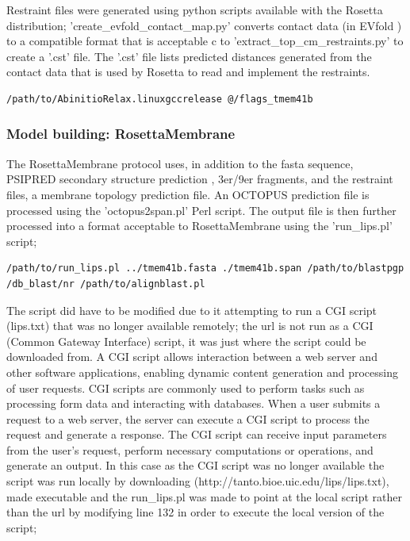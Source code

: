 Restraint files were generated using python scripts available with the Rosetta distribution; 'create\_evfold\_contact\_map.py' converts contact data (in EVfold \cite{braun2015combining}) to a compatible format that is acceptable c to 'extract\_top\_cm\_restraints.py' \cite{braun2015combining} to create a '.cst' file.  The '.cst' file lists predicted distances generated from the contact data that is used by Rosetta to read and implement the restraints.

\begin{lstlisting}[style=linux-terminal]
/path/to/AbinitioRelax.linuxgccrelease @/flags_tmem41b
\end{lstlisting}


\subsubsection{Model building: RosettaMembrane}
The RosettaMembrane protocol \cite{yarov2006multipass} uses, in addition to the fasta sequence, PSIPRED secondary structure prediction \cite{McGuffin2000}, 3er/9er fragments, and the restraint files, a membrane topology prediction file.  An OCTOPUS \cite{Viklund2008} prediction file is processed using the 'octopus2span.pl' Perl script.  The output file is then further processed into a format acceptable to RosettaMembrane using the 'run\_lips.pl' script;

\begin{lstlisting}[style=linux-terminal]
/path/to/run_lips.pl ../tmem41b.fasta ./tmem41b.span /path/to/blastpgp /db_blast/nr /path/to/alignblast.pl
\end{lstlisting}


The script did have to be modified due to it attempting to run a CGI script (lips.txt) that was no longer available remotely; the url is not run as a CGI (Common Gateway Interface) script, it was just where the script could be downloaded from. A CGI  script allows interaction between a web server and other software applications, enabling dynamic content generation and processing of user requests. CGI scripts are commonly used to perform tasks such as processing form data and interacting with databases. When a user submits a request to a web server, the server can execute a CGI script to process the request and generate a response. The CGI script can receive input parameters from the user's request, perform necessary computations or operations, and generate an output. In this case as the CGI script was no longer available the script was run locally by downloading (http://tanto.bioe.uic.edu/lips/lips.txt), made executable and the run\_lips.pl was made to point at the local script rather than the url by modifying line 132 in order to execute the local version of the script;

